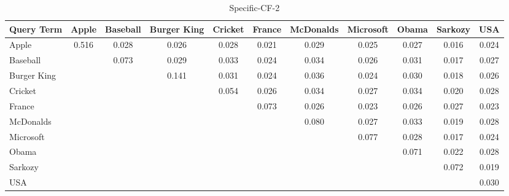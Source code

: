 \documentclass{sig-alternate}
\begin{document}
\begin{table}[!ht]
\centering
\resizebox{14cm}{!} 
{
	\begin{tabular}{|l|c|c|c|c|c|c|c|c|c|c|}
	\hline
	Query Term  & Apple & Baseball & Burger King & Cricket & France & McDonalds & Microsoft & Obama & Sarkozy & USA\\
	\hline
	Apple & 0.516 & 0.028 & 0.026 & 0.028 & 0.021 & 0.029 & 0.025 & 0.027 & 0.016 & 0.024\\
	\hline
	Baseball & & 0.073 & 0.029 & 0.033 & 0.024 & 0.034 & 0.026 & 0.031 & 0.017 & 0.027\\
	\hline
	Burger King & & & 0.141 & 0.031 & 0.024 & 0.036 & 0.024 & 0.030 & 0.018 & 0.026\\
	\hline
	Cricket & & & & 0.054 & 0.026 & 0.034 & 0.027 & 0.034 & 0.020 & 0.028\\
	\hline
	France & & & & & 0.073 & 0.026 & 0.023 & 0.026 & 0.027 & 0.023\\
	\hline
	McDonalds & & & & & & 0.080 & 0.027 & 0.033 & 0.019 & 0.028\\
	\hline
	Microsoft &  &  &  &  &  &  & 0.077 & 0.028 & 0.017 & 0.024
	\\
	\hline
	Obama &  &  &  &  &  &  &  & 0.071 & 0.022 & 0.028
	\\
	\hline
	Sarkozy &  &  &  &  &  &  &  &  & 0.072 & 0.019
	\\
	\hline
	USA &  &  &  &  &  &  &  &  &  & 0.030\\
	\hline
	\end{tabular}
}
\caption{Specific-CF-2}\label{cf4}
\end{table}
\end{document}

